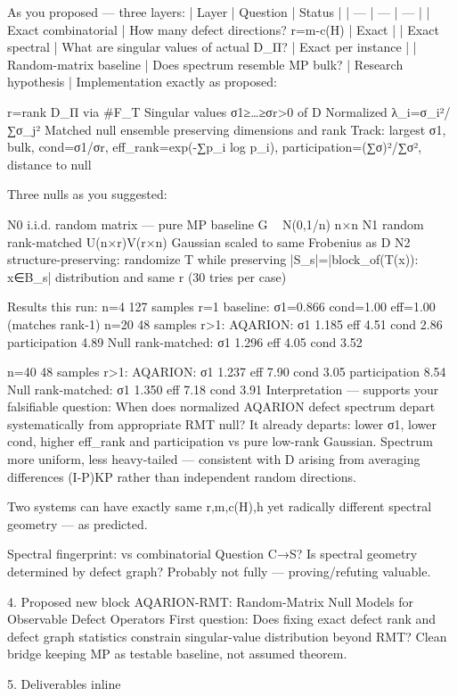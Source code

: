 As you proposed — three layers:
| Layer | Question | Status |
| --- | --- | --- |
| Exact combinatorial | How many defect directions? r=m-c(H) | Exact |
| Exact spectral | What are singular values of actual D_Π? | Exact per instance |
| Random-matrix baseline | Does spectrum resemble MP bulk? | Research hypothesis |
Implementation exactly as proposed:

r=rank D_Π via #F_T
Singular values σ1≥…≥σr>0 of D
Normalized λ_i=σ_i²/∑σ_j²
Matched null ensemble preserving dimensions and rank
Track: largest σ1, bulk, cond=σ1/σr, eff_rank=exp(-∑p_i log p_i), participation=(∑σ)²/∑σ², distance to null

Three nulls as you suggested:

N0 i.i.d. random matrix — pure MP baseline G ~ N(0,1/n) n×n
N1 random rank-matched U(n×r)V(r×n) Gaussian scaled to same Frobenius as D
N2 structure-preserving: randomize T while preserving |S_s|=|{block_of(T(x)): x∈B_s}| distribution and same r (30 tries per case)

Results this run:
n=4 127 samples r=1 baseline: σ1=0.866 cond=1.00 eff=1.00 (matches rank-1)
n=20 48 samples r>1:
  AQARION: σ1 1.185 eff 4.51 cond 2.86 participation 4.89
  Null rank-matched: σ1 1.296 eff 4.05 cond 3.52

n=40 48 samples r>1:
  AQARION: σ1 1.237 eff 7.90 cond 3.05 participation 8.54
  Null rank-matched: σ1 1.350 eff 7.18 cond 3.91
Interpretation — supports your falsifiable question:
When does normalized AQARION defect spectrum depart systematically from appropriate RMT null?
It already departs: lower σ1, lower cond, higher eff_rank and participation vs pure low-rank Gaussian. Spectrum more uniform, less heavy-tailed — consistent with D arising from averaging differences (I-P)KP rather than independent random directions.

Two systems can have exactly same r,m,c(H),h yet radically different spectral geometry — as predicted.

Spectral fingerprint:
vs combinatorial
Question C→S? Is spectral geometry determined by defect graph? Probably not fully — proving/refuting valuable.

4. Proposed new block
AQARION-RMT: Random-Matrix Null Models for Observable Defect Operators
First question: Does fixing exact defect rank and defect graph statistics constrain singular-value distribution beyond RMT?
Clean bridge keeping MP as testable baseline, not assumed theorem.

5. Deliverables inline

